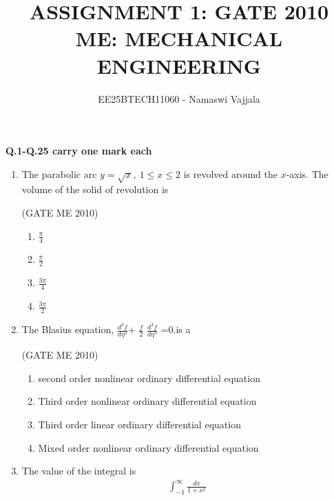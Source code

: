 \documentclass[journal,12pt,onecolumn]{IEEEtran}
\theoremstyle{remark}
\begin{document}
\title{ASSIGNMENT 1: GATE 2010 \\ ME: MECHANICAL ENGINEERING}
\author{EE25BTECH11060 - Namaswi Vajjala}
\maketitle

\renewcommand{\thefigure}{\theenumi}
\renewcommand{\thetable}{\theenumi}

\textbf{Q.1-Q.25 carry one mark each}
\begin{enumerate}
    \item  The parabolic arc $y = \sqrt{x},~1 \le x \le 2$ is revolved around the $x$-axis. The volume of the solid of revolution is

    
    \hfill{(GATE ME 2010)}
\begin{multicols}{4}
\begin{enumerate}
\item  $\frac{\pi}{4}$ 
\item $\frac{\pi}{2}$ 
\item $\frac{3\pi}{4}$ 
\item $\frac{3\pi}{2}$
    \end{enumerate}
\end{multicols}
  

\item The Blasius equation,
$\frac{d^3f}{d\eta^3}$+
$\frac{f}{2}$
$\frac{d^3f}{d\eta^3}$
=0.\;is a

 \hfill{(GATE ME 2010)}
    \begin{enumerate}
\item second order nonlinear ordinary differential equation 
\item Third order nonlinear ordinary differential equation
\item Third order linear ordinary differential equation
\item Mixed order nonlinear ordinary differential equation
    \end{enumerate}

 
\item The value of the integral is
\begin{align*}
\int_{-1}^{\infty} \frac{dx}{1 + x^2}
\end{align*}

\hfill {}


\end{enumerate}
\end{document}
